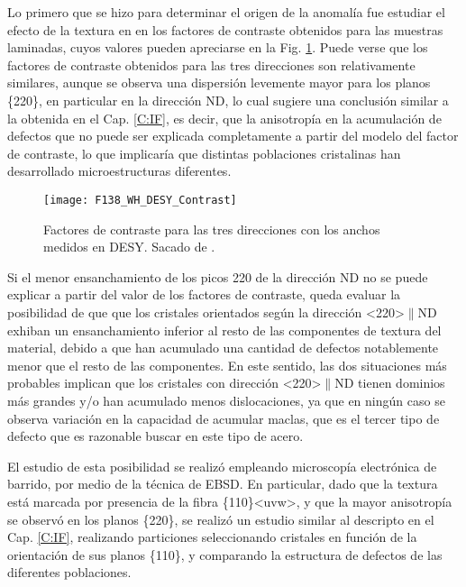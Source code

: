 Lo primero que se hizo para determinar el origen de la anomalía fue estudiar el efecto de la textura en en los factores de contraste obtenidos para las muestras laminadas, cuyos valores pueden apreciarse en la Fig. \ref{fig:F138NatiContrast}.
Puede verse que los factores de contraste obtenidos para las tres direcciones son relativamente similares, aunque se observa una dispersión levemente mayor para los planos \{220\}, en particular en la dirección ND, lo cual sugiere una conclusión similar a la obtenida en el Cap. \ref{C:IF}, es decir, que la anisotropía en la acumulación de defectos que no puede ser explicada completamente a partir del modelo del factor de contraste, lo que implicaría que distintas poblaciones cristalinas han desarrollado microestructuras diferentes.

\begin{figure}[!htb]
  \centering
  \texttt{[image: F138\_WH\_DESY\_Contrast]}
  \caption{Factores de contraste para las tres direcciones con los anchos medidos en DESY. Sacado de \cite{Devincentis2017}.}
  \label{fig:F138NatiContrast}
\end{figure}

Si el menor ensanchamiento de los picos 220 de la dirección ND no se puede explicar a partir del valor de los factores de contraste, queda evaluar la posibilidad de que que los cristales orientados según la dirección \textless220\textgreater$\parallel$ND exhiban un ensanchamiento inferior al resto de las componentes de textura del material, debido a que han acumulado una cantidad de defectos notablemente menor que el resto de las componentes.
En este sentido, las dos situaciones más probables implican que los cristales con dirección \textless220\textgreater$\parallel$ND tienen dominios más grandes y/o han acumulado menos dislocaciones, ya que en ningún caso se observa variación en la capacidad de acumular maclas, que es el tercer tipo de defecto que es razonable buscar en este tipo de acero.

El estudio de esta posibilidad se realizó empleando microscopía electrónica de barrido, por medio de la técnica de EBSD.
En particular, dado que la textura está marcada por presencia de la fibra \{110\}\textless uvw\textgreater, y que la mayor anisotropía se observó en los planos \{220\}, se realizó un estudio similar al descripto en el Cap. \ref{C:IF}, realizando particiones seleccionando cristales en función de la orientación de sus planos \{110\}, y comparando la estructura de defectos de las diferentes poblaciones. 

